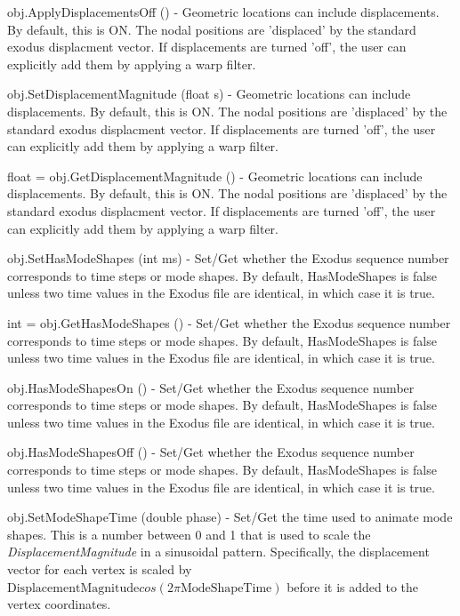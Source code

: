 \begin{DoxyItemize}
\item {\ttfamily obj.\-Apply\-Displacements\-Off ()} -\/ Geometric locations can include displacements. By default, this is O\-N. The nodal positions are 'displaced' by the standard exodus displacment vector. If displacements are turned 'off', the user can explicitly add them by applying a warp filter.  
\item {\ttfamily obj.\-Set\-Displacement\-Magnitude (float s)} -\/ Geometric locations can include displacements. By default, this is O\-N. The nodal positions are 'displaced' by the standard exodus displacment vector. If displacements are turned 'off', the user can explicitly add them by applying a warp filter.  
\item {\ttfamily float = obj.\-Get\-Displacement\-Magnitude ()} -\/ Geometric locations can include displacements. By default, this is O\-N. The nodal positions are 'displaced' by the standard exodus displacment vector. If displacements are turned 'off', the user can explicitly add them by applying a warp filter.  
\item {\ttfamily obj.\-Set\-Has\-Mode\-Shapes (int ms)} -\/ Set/\-Get whether the Exodus sequence number corresponds to time steps or mode shapes. By default, Has\-Mode\-Shapes is false unless two time values in the Exodus file are identical, in which case it is true.  
\item {\ttfamily int = obj.\-Get\-Has\-Mode\-Shapes ()} -\/ Set/\-Get whether the Exodus sequence number corresponds to time steps or mode shapes. By default, Has\-Mode\-Shapes is false unless two time values in the Exodus file are identical, in which case it is true.  
\item {\ttfamily obj.\-Has\-Mode\-Shapes\-On ()} -\/ Set/\-Get whether the Exodus sequence number corresponds to time steps or mode shapes. By default, Has\-Mode\-Shapes is false unless two time values in the Exodus file are identical, in which case it is true.  
\item {\ttfamily obj.\-Has\-Mode\-Shapes\-Off ()} -\/ Set/\-Get whether the Exodus sequence number corresponds to time steps or mode shapes. By default, Has\-Mode\-Shapes is false unless two time values in the Exodus file are identical, in which case it is true.  
\item {\ttfamily obj.\-Set\-Mode\-Shape\-Time (double phase)} -\/ Set/\-Get the time used to animate mode shapes. This is a number between 0 and 1 that is used to scale the {\itshape Displacement\-Magnitude} in a sinusoidal pattern. Specifically, the displacement vector for each vertex is scaled by $ \mathrm{DisplacementMagnitude} cos( 2\pi \mathrm{ModeShapeTime} ) $ before it is added to the vertex coordinates.  

\end{DoxyItemize}
